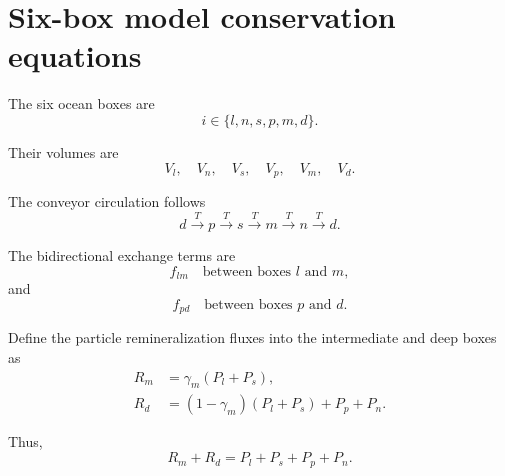 \documentclass[11pt]{article}
\begin{document}
\newpage

%
%
%
%
%
%

\section{Six-box model conservation equations}

The six ocean boxes are
\[
i\in\{l,n,s,p,m,d\}.
\]

Their volumes are
\[
V_l,\quad V_n,\quad V_s,\quad
V_p,\quad V_m,\quad V_d.
\]

The conveyor circulation follows
\begin{equation}
d
\xrightarrow{T}
p
\xrightarrow{T}
s
\xrightarrow{T}
m
\xrightarrow{T}
n
\xrightarrow{T}
d.
\label{eq:six_conveyor}
\end{equation}

The bidirectional exchange terms are
\[
f_{lm}
\quad\text{between boxes }l\text{ and }m,
\]
and
\[
f_{pd}
\quad\text{between boxes }p\text{ and }d.
\]

Define the particle remineralization fluxes into the
intermediate and deep boxes as
\begin{align}
R_m
&=
\gamma_m\left(P_l+P_s\right),
\label{eq:six_Rm}
\\
R_d
&=
\left(1-\gamma_m\right)\left(P_l+P_s\right)
+
P_p+P_n.
\label{eq:six_Rd}
\end{align}

Thus,
\begin{equation}
R_m+R_d
=
P_l+P_s+P_p+P_n.
\label{eq:six_particle_partition}
\end{equation}

\end{document}
